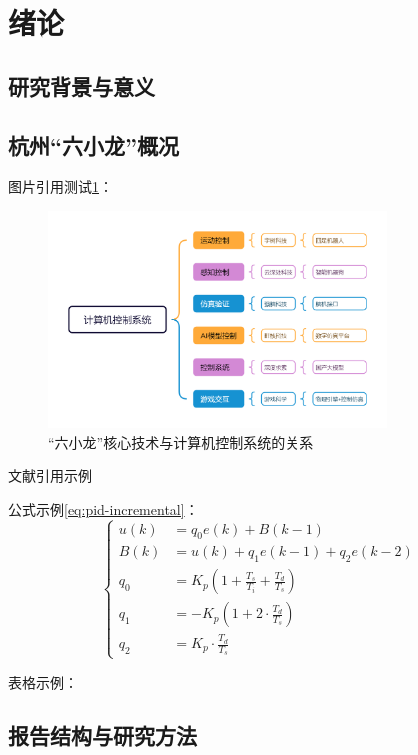 \section{绪论}

\subsection{研究背景与意义}

\subsection{杭州“六小龙”概况}

图片引用测试\ref{fig:myfig2}：

\begin{figure}[H] %
    \centering
    \includegraphics[width=0.8\textwidth]{fig/fig2.png} %
    \caption{“六小龙”核心技术与计算机控制系统的关系}
    \label{fig:myfig2}
\end{figure}

文献引用示例\cite{ccs}

公式示例\ref{eq:pid-incremental}：
\begin{equation}
    \left\{
    \begin{aligned}
        u(k) &= q_0 e(k) + B(k-1) \\
        B(k) &= u(k) + q_1 e(k-1) + q_2 e(k-2) \\
        q_0 &= K_p \left(1 + \frac{T_s}{T_i} + \frac{T_d}{T_s} \right) \\
        q_1 &= -K_p \left(1 + 2 \cdot \frac{T_d}{T_s} \right) \\
        q_2 &= K_p \cdot \frac{T_d}{T_s}
    \end{aligned}
    \right.
    \label{eq:pid-incremental}
    \end{equation} 

表格示例：

\subsection{报告结构与研究方法}

\newpage